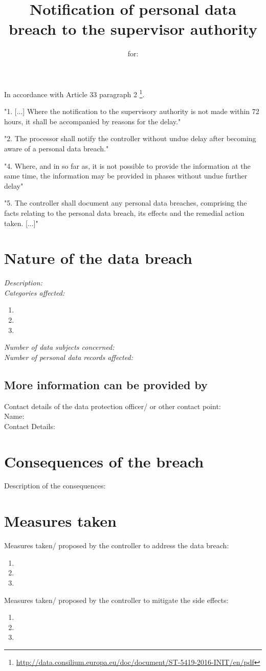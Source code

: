 \documentclass[11pt]{article}
\title{\textbf{Notification of personal data breach to the supervisor authority}}
\author{for: }
\date{}
\begin{document}
\maketitle
In accordance with Article 33 paragraph 2 \footnote{\url{http://data.consilium.europa.eu/doc/document/ST-5419-2016-INIT/en/pdf}}.

"1. [...] Where the notification to the supervisory authority is not made within 72 hours, it shall be accompanied by reasons for the delay."

"2. The processor shall notify the controller without undue delay after becoming aware of a personal data breach." 

"4. Where, and in so far as, it is not possible to provide the information at the same time, the information may be provided in phases without undue further delay"

"5. The controller shall document any personal data breaches, comprising the facts relating to the personal data breach, its effects and the remedial action taken. [...]"

\section{Nature of the data breach}
\textit{Description:}
\\
\textit{Categories affected:}
\begin{enumerate}
  \item 
  \item 
  \item 
\end{enumerate}
\textit{Number of data subjects concerned:}
\\
\textit{Number of personal data records affected:}

\subsection*{More information can be provided by}
Contact details of the data protection officer/ or other contact point:\\
Name:\\
Contact Details:\\

\section{Consequences of the breach}
Description of the consequences:\\

\section{Measures taken}
Measures taken/ proposed by the controller to address the data breach:\\
\begin{enumerate}
  \item 
  \item 
  \item 
\end{enumerate}
Measures taken/ proposed by the controller to mitigate the side effects:\\
\begin{enumerate}
  \item 
  \item 
  \item 
\end{enumerate}
\end{document}
